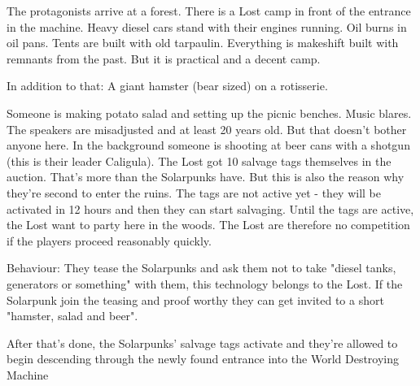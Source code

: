 The protagonists arrive at a forest. There is a Lost camp in front of the entrance in the machine. Heavy diesel cars stand with their engines running. Oil burns in oil pans. Tents are built with old tarpaulin. Everything is makeshift built with remnants from the past. But it is practical and a decent camp.

In addition to that: A giant hamster (bear sized) on a rotisserie.

Someone is making potato salad and setting up the picnic benches. Music blares.
The speakers are misadjusted and at least 20 years old. But that doesn't bother anyone here. In the background someone is shooting at beer cans with a shotgun (this is their leader Caligula). 
The Lost got 10 salvage tags themselves in the auction. That's more than the Solarpunks have. But this is also the reason why they're second to enter the ruins. The tags are not active yet - they will be activated in 12 hours and then they can start salvaging. Until the tags are active, the Lost want to party
here in the woods. The Lost are therefore no competition if the players proceed reasonably quickly.

Behaviour: They tease the Solarpunks and ask them not to take "diesel tanks, generators or something" with
them, this technology belongs to the Lost. If the Solarpunk join the teasing and proof worthy they can get invited to a short "hamster, salad and beer".

After that's done, the Solarpunks' salvage tags activate and they're allowed to begin descending through the newly found entrance into the World Destroying Machine

